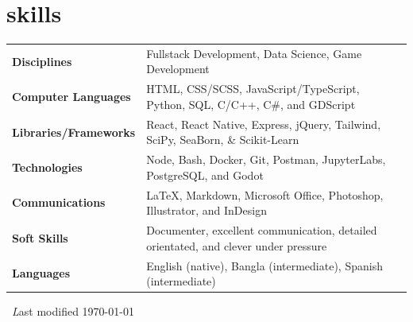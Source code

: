 \documentclass[letterpaper,10pt]{article}
\begin{document}
\section{skills}
\begin{tabularx}{\linewidth}{@{}l X@{}}

\textbf{Disciplines} &  \normalsize{Fullstack Development, Data Science, Game Development}\\
\textbf{Computer Languages}  &  \normalsize{HTML, CSS/SCSS, JavaScript/TypeScript, Python, SQL, C/C++, C\#, and GDScript}\\  
\textbf{Libraries/Frameworks}  &  \normalsize{React, React Native, Express, jQuery, Tailwind, SciPy, SeaBorn, \& Scikit-Learn}\\  
\textbf{Technologies}  &  \normalsize{Node, Bash, Docker, Git, Postman, JupyterLabs, PostgreSQL, and Godot}\\  
\textbf{Communications}  &  \normalsize{ \LaTeX, Markdown, Microsoft Office, Photoshop, Illustrator, and InDesign}\\ 
\textbf{Soft Skills}  &  \normalsize{Documenter,  excellent communication, detailed orientated, and clever under pressure}\\  
\textbf{Languages}  &  \normalsize{English (native), Bangla (intermediate), Spanish (intermediate)}\\  
\end{tabularx}

\
\color{lightgray}\center \small \emph Last modified \today 

\vfill
\end{document}
